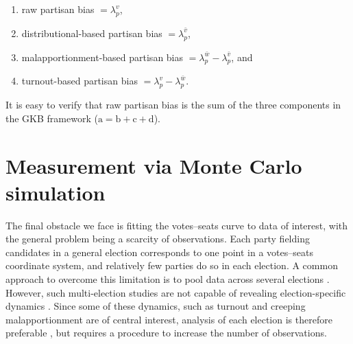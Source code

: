 \documentclass[letter,12pt]{article}
\begin{document}
\begin{enumerate}
\renewcommand{\theenumi}{\alph{enumi}}
\item raw partisan bias $=\lambda_p^v$,
\item distributional-based partisan bias $=\lambda_p^{\bar{v}}$, 
\item malapportionment-based partisan bias $=\lambda_p^{\bar{w}}-\lambda_p^{\bar{v}}$, and
\item turnout-based partisan bias $=\lambda_p^v-\lambda_p^{\bar{w}}$.
\end{enumerate}

\noindent It is easy to verify that raw partisan bias is the sum of the three components in the GKB framework ($\text{a}=\text{b}+\text{c}+\text{d}$). 

\section{Measurement via Monte Carlo simulation}

The final obstacle we face is fitting the votes--seats curve to data of interest, with the general problem being a scarcity of observations. Each party fielding candidates in a general election corresponds to one point in a votes--seats coordinate system, and relatively few parties do so in each election. A common approach to overcome this limitation is to pool data across several elections \citep[e.g.,][]{marquez2014biasBlog}. However, such multi-election studies are not capable of revealing election-specific dynamics \citep{jackmanMeasuringBias1994}. Since some of these dynamics, such as turnout and creeping malapportionment are of central interest, analysis of each election is therefore preferable \citep{niemi.fett1986swing}, but requires a procedure to increase the number of observations.
\end{document}
